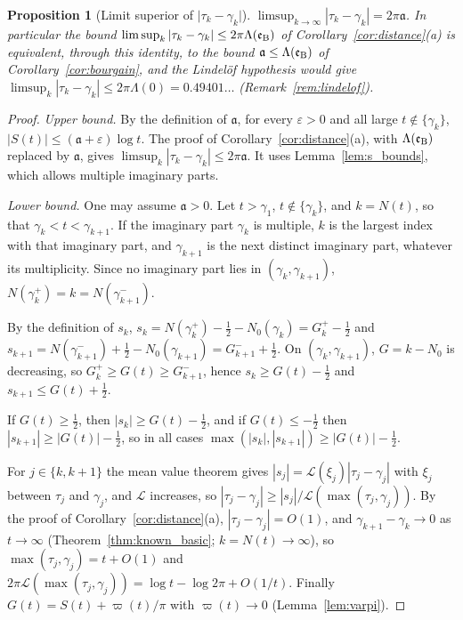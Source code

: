 \documentclass[11pt,a4paper]{article}
\makeatletter
\numberwithin{equation}{section}
\DeclareRobustCommand{\CGref}[1]{\ref{#1}}
\let\CG@origref\ref
\newcommand{\CG@gettip}[1]{\@ifundefined{CGTip@#1}{#1}{\csname CGTip@#1\endcsname}}
\DeclareRobustCommand{\CGref}[1]{\pdftooltip{\CG@origref{#1}}{\CG@gettip{#1}}}
\newtheorem{proposition}[theorem]{Proposition}
\theoremstyle{definition}
\theoremstyle{remark}
\newcommand{\Nz}{N_0} %
\newcommand{\lL}{\mathcal L}
\newcommand{\eB}{\mathfrak e_{\rm B}}
\makeatother
\begin{document}
\begin{proposition}[Limit superior of $\lvert\tau_k-\gamma_k\rvert$]\label{prop:distance_sharp}
$\limsup_{k\to\infty}|\tau_k-\gamma_k|=2\pi\mathfrak a$. In particular the bound $\limsup_k|\tau_k-\gamma_k|\le2\pi\Lambda(\eB)$ of Corollary~\CGref{cor:distance}(a) is equivalent, through this identity, to the bound $\mathfrak a\le\Lambda(\eB)$ of Corollary~\CGref{cor:bourgain}, and the Lindel\"of hypothesis would give $\limsup_k|\tau_k-\gamma_k|\le2\pi\Lambda(0)=0.49401\ldots$ (Remark~\CGref{rem:lindelof}).
\end{proposition}

\begin{proof}
\emph{Upper bound.} By the definition of $\mathfrak a$, for every $\varepsilon>0$ and all large $t\notin\{\gamma_k\}$, $|S(t)|\le(\mathfrak a+\varepsilon)\log t$. The proof of Corollary~\CGref{cor:distance}(a), with $\Lambda(\eB)$ replaced by $\mathfrak a$, gives $\limsup_k|\tau_k-\gamma_k|\le2\pi\mathfrak a$. It uses Lemma~\CGref{lem:s_bounds}, which allows multiple imaginary parts.

\emph{Lower bound.} One may assume $\mathfrak a>0$. Let $t>\gamma_1$, $t\notin\{\gamma_k\}$, and $k=N(t)$, so that $\gamma_k<t<\gamma_{k+1}$. If the imaginary part $\gamma_k$ is multiple, $k$ is the largest index with that imaginary part, and $\gamma_{k+1}$ is the next distinct imaginary part, whatever its multiplicity. Since no imaginary part lies in $(\gamma_k,\gamma_{k+1})$, $N(\gamma_k^+)=k=N(\gamma_{k+1}^-)$.

By the definition of $s_k$, $s_k=N(\gamma_k^+)-\frac12-\Nz(\gamma_k)=G_k^+-\frac12$ and $s_{k+1}=N(\gamma_{k+1}^-)+\frac12-\Nz(\gamma_{k+1})=G_{k+1}^-+\frac12$. On $(\gamma_k,\gamma_{k+1})$, $G=k-\Nz$ is decreasing, so $G_k^+\ge G(t)\ge G_{k+1}^-$, hence $s_k\ge G(t)-\frac12$ and $s_{k+1}\le G(t)+\frac12$.

If $G(t)\ge\frac12$, then $|s_k|\ge G(t)-\frac12$, and if $G(t)\le-\frac12$ then $|s_{k+1}|\ge|G(t)|-\frac12$, so in all cases $\max(|s_k|,|s_{k+1}|)\ge|G(t)|-\frac12$.

For $j\in\{k,k+1\}$ the mean value theorem gives $|s_j|=\lL(\xi_j)|\tau_j-\gamma_j|$ with $\xi_j$ between $\tau_j$ and $\gamma_j$, and $\lL$ increases, so $|\tau_j-\gamma_j|\ge|s_j|/\lL(\max(\tau_j,\gamma_j))$. By the proof of Corollary~\CGref{cor:distance}(a), $|\tau_j-\gamma_j|=O(1)$, and $\gamma_{k+1}-\gamma_k\to0$ as $t\to\infty$ (Theorem~\CGref{thm:known_basic}; $k=N(t)\to\infty$), so $\max(\tau_j,\gamma_j)=t+O(1)$ and $2\pi\lL(\max(\tau_j,\gamma_j))=\log t-\log2\pi+O(1/t)$. Finally $G(t)=S(t)+\varpi(t)/\pi$ with $\varpi(t)\to0$ (Lemma~\CGref{lem:varpi}).


\end{proof}
\end{document}
